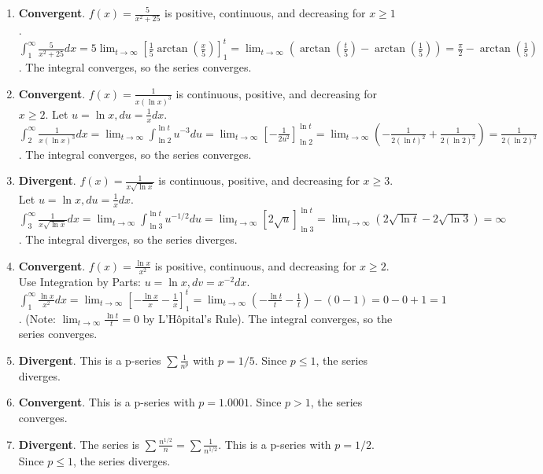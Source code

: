 \documentclass[12pt]{article}
\begin{document}
\begin{enumerate}
    \item \textbf{Convergent}. $f(x) = \frac{5}{x^2+25}$ is positive, continuous, and decreasing for $x \ge 1$.
    $\int_{1}^{\infty} \frac{5}{x^2+25} dx = 5 \lim_{t \to \infty} [\frac{1}{5}\arctan(\frac{x}{5})]_{1}^{t} = \lim_{t \to \infty} (\arctan(\frac{t}{5}) - \arctan(\frac{1}{5})) = \frac{\pi}{2} - \arctan(\frac{1}{5})$. The integral converges, so the series converges.
    
    \item \textbf{Convergent}. $f(x) = \frac{1}{x(\ln x)^3}$ is continuous, positive, and decreasing for $x \ge 2$. Let $u = \ln x, du = \frac{1}{x} dx$.
    $\int_{2}^{\infty} \frac{1}{x(\ln x)^3} dx = \lim_{t \to \infty} \int_{\ln 2}^{\ln t} u^{-3} du = \lim_{t \to \infty} [-\frac{1}{2u^2}]_{\ln 2}^{\ln t} = \lim_{t \to \infty} (-\frac{1}{2(\ln t)^2} + \frac{1}{2(\ln 2)^2}) = \frac{1}{2(\ln 2)^2}$. The integral converges, so the series converges.

    \item \textbf{Divergent}. $f(x) = \frac{1}{x\sqrt{\ln x}}$ is continuous, positive, and decreasing for $x \ge 3$. Let $u = \ln x, du = \frac{1}{x} dx$.
    $\int_{3}^{\infty} \frac{1}{x\sqrt{\ln x}} dx = \lim_{t \to \infty} \int_{\ln 3}^{\ln t} u^{-1/2} du = \lim_{t \to \infty} [2\sqrt{u}]_{\ln 3}^{\ln t} = \lim_{t \to \infty} (2\sqrt{\ln t} - 2\sqrt{\ln 3}) = \infty$. The integral diverges, so the series diverges.

    \item \textbf{Convergent}. $f(x) = \frac{\ln x}{x^2}$ is positive, continuous, and decreasing for $x \ge 2$. Use Integration by Parts: $u = \ln x, dv = x^{-2}dx$.
    $\int_{1}^{\infty} \frac{\ln x}{x^2} dx = \lim_{t \to \infty} [-\frac{\ln x}{x} - \frac{1}{x}]_{1}^{t} = \lim_{t \to \infty} (-\frac{\ln t}{t} - \frac{1}{t}) - (0-1) = 0 - 0 + 1 = 1$. (Note: $\lim_{t\to\infty} \frac{\ln t}{t} = 0$ by L'Hôpital's Rule). The integral converges, so the series converges.

    \item \textbf{Divergent}. This is a p-series $\sum \frac{1}{n^p}$ with $p = 1/5$. Since $p \le 1$, the series diverges.

    \item \textbf{Convergent}. This is a p-series with $p = 1.0001$. Since $p > 1$, the series converges.
    
    \item \textbf{Divergent}. The series is $\sum \frac{n^{1/2}}{n} = \sum \frac{1}{n^{1/2}}$. This is a p-series with $p = 1/2$. Since $p \le 1$, the series diverges.
    

\end{enumerate}
\end{document}
